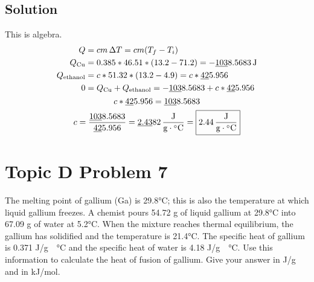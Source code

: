 \documentclass[10pt]{article}
\newcommand{\U}[1]{\underline{#1}}
\begin{document}
        \subsection{Solution}
            This is algebra.
            \begin{gather}
                \begin{align}
                    Q   &=  cm\,\Delta T
                        =   cm(T_f - T_i)\\
                    Q_{\rm Cu}  &=  0.385 * 46.51 * (13.2 - 71.2)
                        =   -\U{103}8.5683\,\unit{\joule}\\
                    Q_{\rm ethanol} &=  c * 51.32 * (13.2 - 4.9)
                        =   c * \U{42}5.956\\
                    0   &=  Q_{\rm Cu} + Q_{\rm ethanol}
                        =   -\U{103}8.5683 + c * \U{42}5.956
                \end{align}\\
                c * \U{42}5.956 =   \U{103}8.5683\\
                c   =   \frac{\U{103}8.5683}{\U{42}5.956}
                    =   \U{2.43}82\,\unit{\frac{\joule}{\gram\cdot\celsius}}
                    =   \boxed{2.44\,\unit{\frac{\joule}{\gram\cdot\celsius}}}
            \end{gather}

    \pagebreak
    \section{Topic D Problem 7}
        The melting point of gallium (Ga) is 29.8\unit{\celsius}; this is also the temperature at which liquid gallium freezes. 
        A chemist pours 54.72 g of liquid gallium at 29.8\unit{\celsius} into 67.09 g of water at 5.2\unit{\celsius}. 
        When the mixture reaches thermal equilibrium, the gallium has solidified and the temperature is 21.4\unit{\celsius}. 
        The specific heat of gallium is 0.371 \unit{\joule/\gram\cdot\celsius} and the specific heat of water is 4.18 \unit{\joule/\gram\cdot\celsius}. 
        Use this information to calculate the heat of fusion of gallium. 
        Give your answer in J/g and in kJ/mol.
\end{document}
